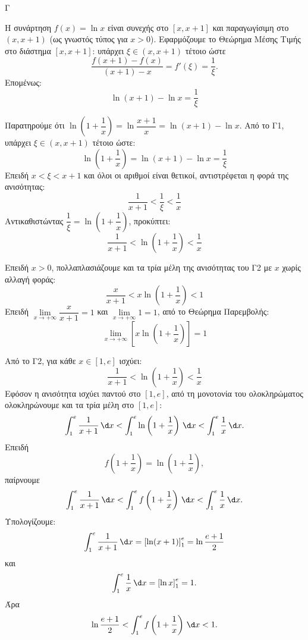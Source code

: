 \begin{thema}{Γ}
\begin{erwthma}
\item Η συνάρτηση $f(x)=\ln x$ είναι συνεχής στο $[x,x+1]$ και παραγωγίσιμη στο $(x,x+1)$ (ως γνωστός τύπος για $x>0$). Εφαρμόζουμε το Θεώρημα Μέσης Τιμής στο διάστημα $[x,x+1]$: υπάρχει $\xi\in(x,x+1)$ τέτοιο ώστε
\[
\frac{f(x+1)-f(x)}{(x+1)-x}=f'(\xi)=\frac{1}{\xi}.
\]
Επομένως:
\[
\ln(x+1)-\ln x=\frac{1}{\xi}\]

\item Παρατηρούμε ότι $\ln\left(1+\dfrac{1}{x}\right)=\ln\dfrac{x+1}{x}=\ln(x+1)-\ln x$. Από το Γ1, υπάρχει $\xi\in(x,x+1)$ τέτοιο ώστε:
\[
\ln\left(1+\frac{1}{x}\right)=\ln(x+1)-\ln x=\frac{1}{\xi}
\]
Επειδή $x<\xi<x+1$ και όλοι οι αριθμοί είναι θετικοί, αντιστρέφεται η φορά της ανισότητας:
\[
\frac{1}{x+1}<\frac{1}{\xi}<\frac{1}{x}
\]
Αντικαθιστώντας $\dfrac{1}{\xi}=\ln\left(1+\dfrac{1}{x}\right)$, προκύπτει:
\[
\frac{1}{x+1}<\ln\left(1+\frac{1}{x}\right)<\frac{1}{x}
\]

\item Επειδή $x>0$, πολλαπλασιάζουμε και τα τρία μέλη της ανισότητας του Γ2 με $x$ χωρίς αλλαγή φοράς:
\[
\frac{x}{x+1}<x\ln\left(1+\frac{1}{x}\right)<1
\]
Επειδή $\lim\limits_{x\to +\infty}\dfrac{x}{x+1}=1$ και $\lim\limits_{x\to +\infty}1=1$, από το Θεώρημα Παρεμβολής:
\[
\lim_{x\to +\infty}\left[x\ln\left(1+\frac{1}{x}\right)\right]=1
\]

\item Από το Γ2, για κάθε $x\in[1,e]$ ισχύει:
\[
\frac{1}{x+1}<\ln\left(1+\frac{1}{x}\right)<\frac{1}{x}
\]
Εφόσον η ανισότητα ισχύει παντού στο $[1,e]$, από τη μονοτονία του ολοκληρώματος ολοκληρώνουμε και τα τρία μέλη στο $[1,e]$:
\[
\int_1^e \frac{1}{x+1}\,\d x
<
\int_1^e \ln\left(1+\frac{1}{x}\right)\,\d x
<
\int_1^e \frac{1}{x}\,\d x.
\]
Επειδή
\[
f\left(1+\frac{1}{x}\right)=\ln\left(1+\frac{1}{x}\right),
\]
παίρνουμε
\[
\int_1^e \frac{1}{x+1}\,\d x
<
\int_1^e f\left(1+\frac{1}{x}\right)\,\d x
<
\int_1^e \frac{1}{x}\,\d x.
\]
Υπολογίζουμε:
\[
\int_1^e \frac{1}{x+1}\,\d x
=
\left[\ln(x+1)\right]_1^e
=
\ln\frac{e+1}{2}
\]
και
\[
\int_1^e \frac{1}{x}\,\d x
=
\left[\ln x\right]_1^e
=1.
\]
Άρα
\[
\ln\frac{e+1}{2}
<
\int_1^e f\left(1+\frac{1}{x}\right)\,\d x
<
1.
\]
\end{erwthma}
\end{thema}

